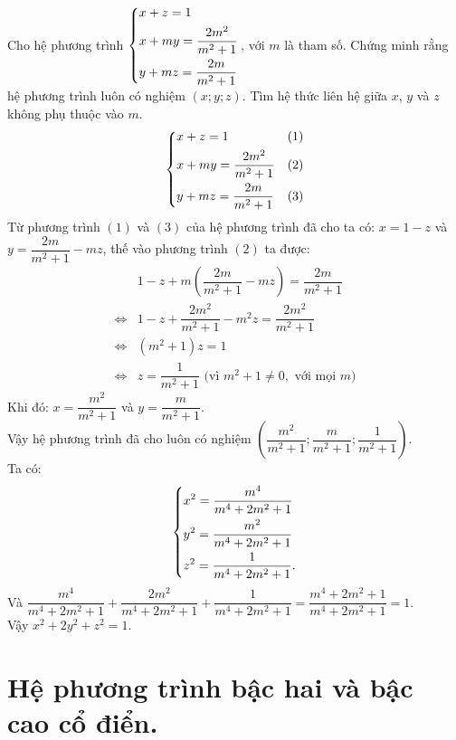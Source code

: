 \begin{ex}%
 Cho hệ phương trình $\left\{\begin{aligned}& x+z = 1 \\& x+my = \dfrac{2m^2}{m^2+1} \\& y+mz = \dfrac{2m}{m^2+1}\end{aligned}\right.$, với $m$ là tham số. Chứng minh rằng hệ phương trình luôn có nghiệm $(x;y;z)$. Tìm hệ thức liên hệ giữa $x$, $y$ và $z$ không phụ thuộc vào $m$.
 \loigiai
  {
  $$\left\{\begin{aligned}& x+z = 1 & (1) \\& x+my = \dfrac{2m^2}{m^2+1} & (2) \\& y+mz = \dfrac{2m}{m^2+1} & (3)\end{aligned}\right.$$
  Từ phương trình $(1)$ và $(3)$ của hệ phương trình đã cho ta có: $x=1-z$ và $y = \dfrac{2m}{m^2+1}-mz$, thế vào phương trình $(2)$ ta được:
  \begin{align*}
   				   & 1 - z + m \left( \dfrac{2m}{m^2+1}-mz \right)  = \dfrac{2m}{m^2+1}\\
   \Leftrightarrow & 1 - z + \dfrac{2m^2}{m^2+1} - m^2z  = \dfrac{2m^2}{m^2+1}\\
   \Leftrightarrow & (m^2+1)z = 1 \\
   \Leftrightarrow & z = \dfrac{1}{m^2+1} \text{ (vì } m^2 + 1 \neq 0, \text{ với mọi } m)
  \end{align*}
  Khi đó: $x = \dfrac{m^2}{m^2+1}$ và $y = \dfrac{m}{m^2+1}$.\\
  Vậy hệ phương trình đã cho luôn có nghiệm $\left( \dfrac{m^2}{m^2+1}; \dfrac{m}{m^2+1}; \dfrac{1}{m^2+1} \right)$.\\
  Ta có: $$\left\{\begin{aligned}& x^2 = \dfrac{m^4}{m^4 + 2m^2 + 1} \\& y^2 = \dfrac{m^2}{m^4 + 2m^2 + 1} \\& z^2 = \dfrac{1}{m^4 + 2m^2 + 1}.\end{aligned}\right.$$
  Và $ \dfrac{m^4}{m^4+2m^2+1} + \dfrac{2m^2}{m^4+2m^2+1} + \dfrac{1}{m^4+2m^2+1} = \dfrac{m^4+2m^2+1}{m^4+2m^2+1} = 1$.\\
  Vậy $x^2 + 2y^2 + z^2 = 1$.
  }
\end{ex}

\section{Hệ phương trình bậc hai và bậc cao cổ điển.}

